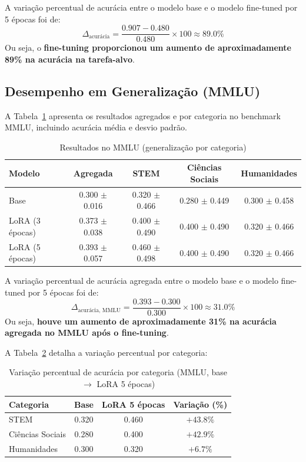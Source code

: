 \documentclass[journal,onecolumn]{IEEEtran}
\begin{document}
A variação percentual de acurácia entre o modelo base e o modelo fine-tuned por 5 épocas foi de:
\[
\Delta_{\text{acurácia}} = \frac{0.907 - 0.480}{0.480} \times 100 \approx 89.0\%
\]
Ou seja, o \textbf{fine-tuning proporcionou um aumento de aproximadamente 89\% na acurácia na tarefa-alvo}.

\subsection{Desempenho em Generalização (MMLU)}

A Tabela~\ref{tab:mmlu_results} apresenta os resultados agregados e por categoria no benchmark MMLU, incluindo acurácia média e desvio padrão.

\begin{table}[h]
\centering
\caption{Resultados no MMLU (generalização por categoria)}
\label{tab:mmlu_results}
\begin{tabular}{lcccc}
\toprule
\textbf{Modelo} & \textbf{Agregada} & \textbf{STEM} & \textbf{Ciências Sociais} & \textbf{Humanidades} \\
\midrule
Base & 0.300 $\pm$ 0.016 & 0.320 $\pm$ 0.466 & 0.280 $\pm$ 0.449 & 0.300 $\pm$ 0.458 \\
LoRA (3 épocas) & 0.373 $\pm$ 0.038 & 0.400 $\pm$ 0.490 & 0.400 $\pm$ 0.490 & 0.320 $\pm$ 0.466 \\
LoRA (5 épocas) & 0.393 $\pm$ 0.057 & 0.460 $\pm$ 0.498 & 0.400 $\pm$ 0.490 & 0.320 $\pm$ 0.466 \\
\bottomrule
\end{tabular}
\end{table}

A variação percentual de acurácia agregada entre o modelo base e o modelo fine-tuned por 5 épocas foi de:
\[
\Delta_{\text{acurácia, MMLU}} = \frac{0.393 - 0.300}{0.300} \times 100 \approx 31.0\%
\]
Ou seja, \textbf{houve um aumento de aproximadamente 31\% na acurácia agregada no MMLU após o fine-tuning}.

A Tabela~\ref{tab:mmlu_delta} detalha a variação percentual por categoria:

\begin{table}[h]
\centering
\caption{Variação percentual de acurácia por categoria (MMLU, base $\rightarrow$ LoRA 5 épocas)}
\label{tab:mmlu_delta}
\begin{tabular}{lccc}
\toprule
\textbf{Categoria} & \textbf{Base} & \textbf{LoRA 5 épocas} & \textbf{Variação (\%)} \\
\midrule
STEM & 0.320 & 0.460 & $+43.8\%$ \\
Ciências Sociais & 0.280 & 0.400 & $+42.9\%$ \\
Humanidades & 0.300 & 0.320 & $+6.7\%$ \\
\bottomrule
\end{tabular}
\end{table}
\end{document}
